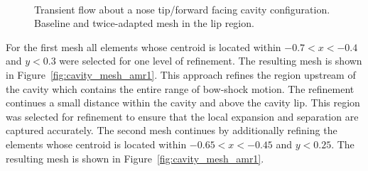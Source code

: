 \begin{figure}[hbtp]
  \begin{center}
     \\
      \caption{Transient flow about a nose tip/forward facing cavity configuration.  Baseline and twice-adapted mesh in the lip region.\label{fig:cavity_mesh_amr2}}
  \end{center}
\end{figure}
For the first mesh all elements whose centroid is located within $-0.7<x<-0.4$ and $y<0.3$ were selected for one level of refinement.  The resulting mesh is shown in Figure~\ref{fig:cavity_mesh_amr1}.  This approach refines the region upstream of the cavity which contains the entire range of bow-shock motion.  The refinement continues a small distance within the cavity and above the cavity lip.  This region was selected for refinement to ensure that the local expansion and separation are captured accurately. The second mesh continues by additionally refining  the elements whose centroid is located within $-0.65<x<-0.45$ and $y<0.25$.  The resulting mesh is shown in Figure~\ref{fig:cavity_mesh_amr1}.


